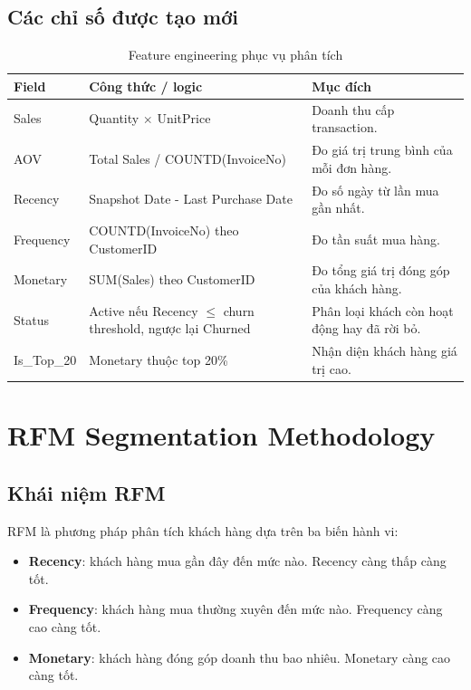 \documentclass[11pt,a4paper]{article}
\begin{document}
\subsection{Các chỉ số được tạo mới}

\begin{table}[H]
\centering
\caption{Feature engineering phục vụ phân tích}
\begin{tabularx}{\textwidth}{p{3.5cm}p{5cm}X}
\toprule
\textbf{Field} & \textbf{Công thức / logic} & \textbf{Mục đích} \\
\midrule
Sales & Quantity $\times$ UnitPrice & Doanh thu cấp transaction. \\
AOV & Total Sales / COUNTD(InvoiceNo) & Đo giá trị trung bình của mỗi đơn hàng. \\
Recency & Snapshot Date - Last Purchase Date & Đo số ngày từ lần mua gần nhất. \\
Frequency & COUNTD(InvoiceNo) theo CustomerID & Đo tần suất mua hàng. \\
Monetary & SUM(Sales) theo CustomerID & Đo tổng giá trị đóng góp của khách hàng. \\
Status & Active nếu Recency $\le$ churn threshold, ngược lại Churned & Phân loại khách còn hoạt động hay đã rời bỏ. \\
Is\_Top\_20 & Monetary thuộc top 20\% & Nhận diện khách hàng giá trị cao. \\
\bottomrule
\end{tabularx}
\end{table}

\section{RFM Segmentation Methodology}

\subsection{Khái niệm RFM}

RFM là phương pháp phân tích khách hàng dựa trên ba biến hành vi:

\begin{itemize}
    \item \textbf{Recency}: khách hàng mua gần đây đến mức nào. Recency càng thấp càng tốt.
    \item \textbf{Frequency}: khách hàng mua thường xuyên đến mức nào. Frequency càng cao càng tốt.
    \item \textbf{Monetary}: khách hàng đóng góp doanh thu bao nhiêu. Monetary càng cao càng tốt.
\end{itemize}
\end{document}
